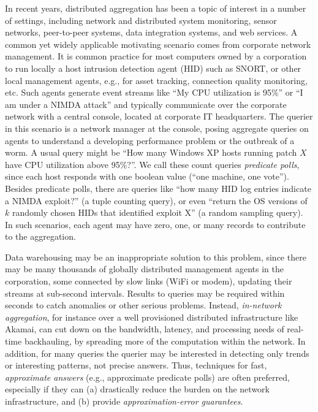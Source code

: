 \documentclass[10pt,twocolumn]{article}
\begin{document}
\vspace{-1em}
In recent years, distributed aggregation has been a topic of
interest in a number of settings, including network and distributed
system monitoring, sensor networks, peer-to-peer systems, data
integration systems, and web services.
A common yet widely applicable motivating scenario comes from corporate
network
management.  It is common practice for most
computers owned by a corporation to run locally a host intrusion detection agent
(HID) such as SNORT, or other local management agents, e.g., for asset
tracking, connection quality monitoring, etc.  
Such agents generate event streams like ``My CPU utilization is 95\%'' or ``I
am under a NIMDA attack'' and  typically
communicate over the corporate network
with a central console, located at corporate IT
headquarters.  
The querier in this scenario is a network manager at the console,
posing aggregate queries on agents to understand a developing
performance problem or the
outbreak of a worm.  A usual query might be ``How many Windows XP
hosts running patch $X$ have CPU utilization above 95\%?''.  We call
these count queries \emph{predicate polls}, since each host
responds with one boolean value (``one machine, one
vote''). Besides predicate
polls, there are queries like ``how many HID log entries indicate a NIMDA
exploit?'' (a tuple counting query), or even ``return the OS versions of
$k$ randomly chosen
HIDs that identified exploit X'' (a random sampling query).  In
such scenarios, each agent may have zero, one, or many records to
contribute to the aggregation.

Data warehousing may be an inappropriate solution to this problem,
since there may be many thousands of globally distributed
management agents
in the corporation, some connected by slow links (WiFi or modem),
updating their streams at sub-second intervals.  Results to queries may be
required within seconds to catch anomalies or other serious problems.
Instead, \emph{in-network aggregation}, for instance over a well
provisioned distributed infrastructure like Akamai, can cut down on the
bandwidth, latency, and processing needs
of real-time backhauling, by spreading more of the computation
within the
network.
In addition, for many queries the querier
may be interested in detecting only trends or interesting patterns, not
precise answers.
Thus,  techniques for fast, \emph{approximate answers} (e.g., approximate predicate 
polls) are often preferred, especially if they can 
(a) drastically reduce the burden on the network infrastructure, and
(b) provide \emph{approximation-error guarantees}.
\end{document}
